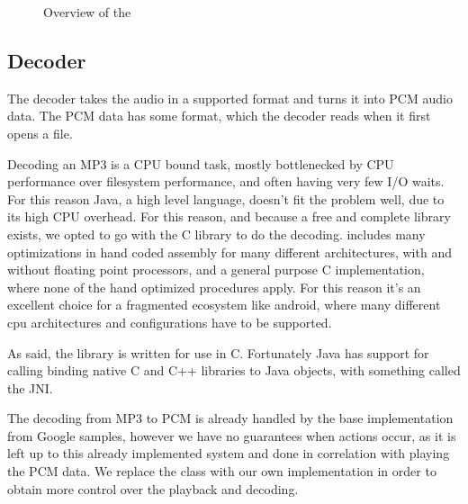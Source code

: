 \begin{figure}[ht]
	\centering
	\caption{Overview of the }\label{fig:mediaplayerParts}
\end{figure}

\subsection{Decoder}
\label{subsec:decoder}

The decoder takes the audio in a supported format and turns it into
\ac{PCM} audio data. The \ac{PCM} data has some format, which the
decoder reads when it first opens a file.

Decoding an MP3 is a CPU bound task, mostly bottlenecked by CPU
performance over filesystem performance, and often having very few I/O
waits. For this reason Java, a high level language, doesn't fit the
problem well, due to its high CPU overhead. For this reason, and because
a free and complete library exists, we opted to go with the C library
 to do the decoding.  includes many
optimizations in hand coded assembly for many different architectures,
with and without floating point processors, and a general purpose
C implementation, where none of the hand optimized procedures apply. For
this reason it's an excellent choice for a fragmented ecosystem like
android, where many different cpu architectures and configurations have
to be supported.

As said, the library is written for use in C. Fortunately Java has
support for calling binding native C and C++ libraries to Java objects,
with something called the \ac{JNI}.

The decoding from MP3 to \ac{PCM} is already handled by the base implementation from Google samples, however we have no guarantees when actions occur, as it is left up to this already implemented system and done in correlation with playing the \ac{PCM} data.
We replace the  class with our own implementation in order to obtain more control over the playback and decoding.

